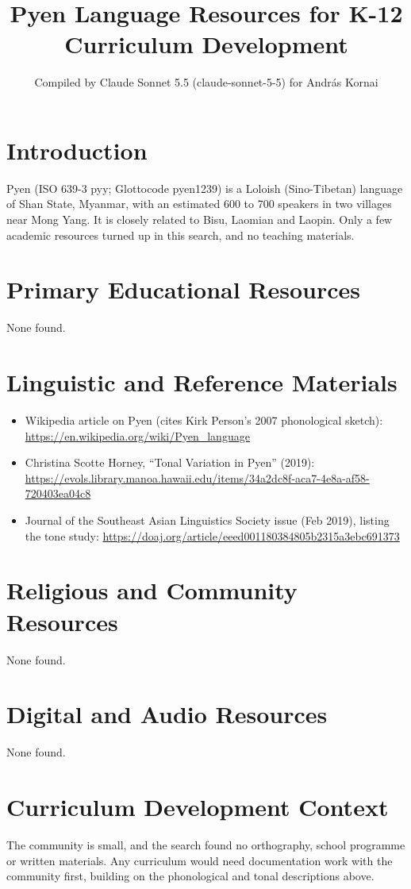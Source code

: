 \documentclass[12pt]{article}
\title{Pyen Language Resources for K-12 Curriculum Development}
\author{Compiled by Claude Sonnet 5.5 (claude-sonnet-5-5) for Andr\'as Kornai}
\date{}
\begin{document}
\maketitle

\section{Introduction}
Pyen (ISO 639-3 pyy; Glottocode pyen1239) is a Loloish (Sino-Tibetan) language of Shan State, Myanmar, with an estimated 600 to 700 speakers in two villages near Mong Yang. It is closely related to Bisu, Laomian and Laopin. Only a few academic resources turned up in this search, and no teaching materials.

\section{Primary Educational Resources}
None found.

\section{Linguistic and Reference Materials}
\begin{itemize}
\item Wikipedia article on Pyen (cites Kirk Person's 2007 phonological sketch): \url{https://en.wikipedia.org/wiki/Pyen_language}
\item Christina Scotte Horney, ``Tonal Variation in Pyen'' (2019): \url{https://evols.library.manoa.hawaii.edu/items/34a2dc8f-aca7-4e8a-af58-720403ea04c8}
\item Journal of the Southeast Asian Linguistics Society issue (Feb 2019), listing the tone study: \url{https://doaj.org/article/eeed001180384805b2315a3ebc691373}
\end{itemize}

\section{Religious and Community Resources}
None found.

\section{Digital and Audio Resources}
None found.

\section{Curriculum Development Context}
The community is small, and the search found no orthography, school programme or written materials. Any curriculum would need documentation work with the community first, building on the phonological and tonal descriptions above.
\end{document}
